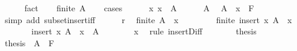 \begin{isabellebody}
\ \ \ \ \isamarkupfalse%
\ fact{\isacharplus}{\kern0pt}\isanewline
\ \ \isamarkupfalse%
\ {\isachardoublequoteopen}finite\ A{\isachardoublequoteclose}\isanewline
\ \ \isamarkupfalse%
\ cases\isanewline
\ \ \ \ \isamarkupfalse%
\ x{\isacharcolon}{\kern0pt}\ {\isachardoublequoteopen}x\ {\isasymin}\ A{\isachardoublequoteclose}\isanewline
\ \ \ \ \isamarkupfalse%
\ A\ \isamarkupfalse%
\ {\isachardoublequoteopen}A\ {\isacharminus}{\kern0pt}\ {\isacharbraceleft}{\kern0pt}x{\isacharbraceright}{\kern0pt}\ {\isasymsubseteq}\ F{\isachardoublequoteclose}\ \isamarkupfalse%
\ {\isacharparenleft}{\kern0pt}simp\ add{\isacharcolon}{\kern0pt}\ subset{\isacharunderscore}{\kern0pt}insert{\isacharunderscore}{\kern0pt}iff{\isacharparenright}{\kern0pt}\isanewline
\ \ \ \ \isamarkupfalse%
\ r\ \isamarkupfalse%
\ {\isachardoublequoteopen}finite\ {\isacharparenleft}{\kern0pt}A\ {\isacharminus}{\kern0pt}\ {\isacharbraceleft}{\kern0pt}x{\isacharbraceright}{\kern0pt}{\isacharparenright}{\kern0pt}{\isachardoublequoteclose}\ \isacommand{{\isachardot}{\kern0pt}}\isamarkupfalse%
\isanewline
\ \ \ \ \isamarkupfalse%
\ \isamarkupfalse%
\ {\isachardoublequoteopen}finite\ {\isacharparenleft}{\kern0pt}insert\ x\ {\isacharparenleft}{\kern0pt}A\ {\isacharminus}{\kern0pt}\ {\isacharbraceleft}{\kern0pt}x{\isacharbraceright}{\kern0pt}{\isacharparenright}{\kern0pt}{\isacharparenright}{\kern0pt}{\isachardoublequoteclose}\ \isacommand{{\isachardot}{\kern0pt}{\isachardot}{\kern0pt}}\isamarkupfalse%
\isanewline
\ \ \ \ \isamarkupfalse%
\ \isamarkupfalse%
\ {\isachardoublequoteopen}insert\ x\ {\isacharparenleft}{\kern0pt}A\ {\isacharminus}{\kern0pt}\ {\isacharbraceleft}{\kern0pt}x{\isacharbraceright}{\kern0pt}{\isacharparenright}{\kern0pt}\ {\isacharequal}{\kern0pt}\ A{\isachardoublequoteclose}\isanewline
\ \ \ \ \ \ \isamarkupfalse%
\ x\ \isamarkupfalse%
\ {\isacharparenleft}{\kern0pt}rule\ insert{\isacharunderscore}{\kern0pt}Diff{\isacharparenright}{\kern0pt}\isanewline
\ \ \ \ \isamarkupfalse%
\ \isamarkupfalse%
\ {\isacharquery}{\kern0pt}thesis\ \isacommand{{\isachardot}{\kern0pt}}\isamarkupfalse%
\isanewline
\ \ \isamarkupfalse%
\isanewline
\ \ \ \ \isamarkupfalse%
\ {\isacharquery}{\kern0pt}thesis\ \ {\isachardoublequoteopen}A\ {\isasymsubseteq}\ F{\isachardoublequoteclose}\isanewline

\end{isabellebody}

